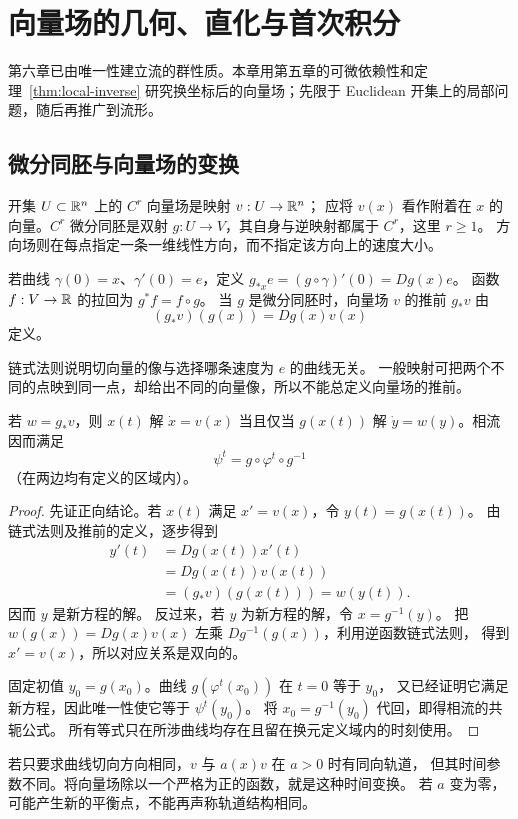 \chapter{向量场的几何、直化与首次积分}
\label{chap:arnold-geometry}

第六章已由唯一性建立流的群性质。本章用第五章的可微依赖性和定理~\ref{thm:local-inverse} 研究换坐标后的向量场；先限于 Euclidean 开集上的局部问题，随后再推广到流形。

\section{微分同胚与向量场的变换}
\begin{definition}
开集 $U\subset\mathbb{R}^n$ 上的 $C^r$ 向量场是映射 $v:U\to\mathbb{R}^n$；
应将 $v(x)$ 看作附着在 $x$ 的向量。$C^r$ 微分同胚是双射
$g:U\to V$，其自身与逆映射都属于 $C^r$，这里 $r\geq1$。
方向场则在每点指定一条一维线性方向，而不指定该方向上的速度大小。
\end{definition}
\begin{definition}[微分、拉回与推前]
若曲线 $\gamma(0)=x$、$\gamma'(0)=e$，定义
$g_{*x}e=(g\circ\gamma)'(0)=Dg(x)e$。
函数 $f:V\to\mathbb{R}$ 的拉回为 $g^*f=f\circ g$。
当 $g$ 是微分同胚时，向量场 $v$ 的推前 $g_*v$ 由
\[
 (g_*v)(g(x))=Dg(x)v(x)
\]
定义。
\end{definition}
链式法则说明切向量的像与选择哪条速度为 $e$ 的曲线无关。
一般映射可把两个不同的点映到同一点，却给出不同的向量像，所以不能总定义向量场的推前。

\begin{theorem}[换元与相流]
若 $w=g_*v$，则 $x(t)$ 解 $\dot x=v(x)$ 当且仅当 $g(x(t))$ 解
$\dot y=w(y)$。相流因而满足
\[
 \psi^t=g\circ\varphi^t\circ g^{-1}
\]
（在两边均有定义的区域内）。
\end{theorem}
\begin{proof}
先证正向结论。若 $x(t)$ 满足 $x'=v(x)$，令 $y(t)=g(x(t))$。
由链式法则及推前的定义，逐步得到
\begin{align*}
 y'(t)&=Dg(x(t))x'(t)\\
 &=Dg(x(t))v(x(t))\\
 &=(g_*v)(g(x(t)))=w(y(t)).
\end{align*}
因而 $y$ 是新方程的解。
反过来，若 $y$ 为新方程的解，令 $x=g^{-1}(y)$。
把 $w(g(x))=Dg(x)v(x)$ 左乘 $Dg^{-1}(g(x))$，利用逆函数链式法则，
得到 $x'=v(x)$，所以对应关系是双向的。

固定初值 $y_0=g(x_0)$。曲线 $g(\varphi^t(x_0))$ 在 $t=0$ 等于 $y_0$，
又已经证明它满足新方程，因此唯一性使它等于 $\psi^t(y_0)$。
将 $x_0=g^{-1}(y_0)$ 代回，即得相流的共轭公式。
所有等式只在所涉曲线均存在且留在换元定义域内的时刻使用。
\end{proof}
若只要求曲线切向方向相同，$v$ 与 $a(x)v$ 在 $a>0$ 时有同向轨道，
但其时间参数不同。将向量场除以一个严格为正的函数，就是这种时间变换。
若 $a$ 变为零，可能产生新的平衡点，不能再声称轨道结构相同。


